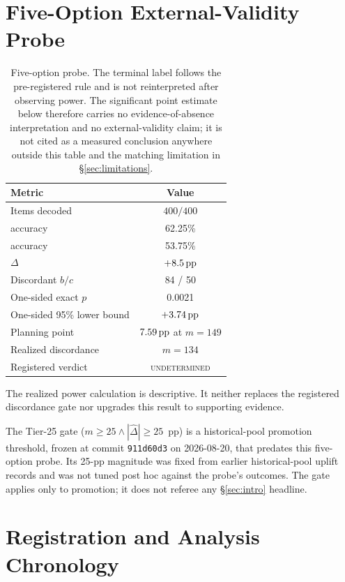 \section{Five-Option External-Validity Probe}
\label{app:5option}

\begin{table}[H]
\centering
\small
\caption{Five-option probe.  The terminal label follows the pre-registered
rule and is not reinterpreted after observing power.  The significant point
estimate below therefore carries no evidence-of-absence interpretation and no
external-validity claim; it is not cited as a measured conclusion anywhere
outside this table and the matching limitation in \S\ref{sec:limitations}.}
\label{tab:5option}
\begin{tabular}{@{}lc@{}}
\toprule
Metric & Value \\
\midrule
Items decoded & $400/400$ \\
\sconf{} accuracy & 62.25\% \\
\rinj{} accuracy & 53.75\% \\
$\Delta$ & $+8.5\,\mathrm{pp}$ \\
Discordant $b/c$ & 84 / 50 \\
One-sided exact $p$ & 0.0021 \\
One-sided 95\% lower bound & $+3.74\,\mathrm{pp}$ \\
Planning point & $7.59\,\mathrm{pp}$ at $m=149$ \\
Realized discordance & $m=134$ \\
Registered verdict & \textsc{undetermined} \\
\bottomrule
\end{tabular}
\end{table}

The realized power calculation is descriptive.  It neither replaces the
registered discordance gate nor upgrades this result to supporting evidence.

The Tier-25 gate ($m \ge 25 \wedge |\widehat{\Delta}| \ge 25$~pp) is a
historical-pool promotion threshold, frozen at commit \texttt{911d60d3} on
2026-08-20, that predates this five-option probe.  Its 25-pp magnitude was
fixed from earlier historical-pool uplift records and was not tuned post hoc
against the probe's outcomes.  The gate applies only to promotion; it does
not referee any \S\ref{sec:intro} headline.

\section{Registration and Analysis Chronology}
\label{app:revision}

